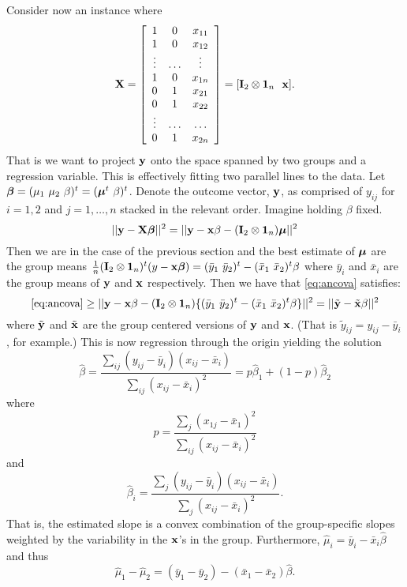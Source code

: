 Consider now an instance where
$$
\mathbf{X} =
\left[
\begin{array}{ccc}
1 & 0  & x_{11} \\
1 & 0  & x_{12} \\
\vdots &  \ldots  & \vdots \\
1  & 0 & x_{1n}  \\
0  & 1 & x_{21} \\
0  & 1 & x_{22} \\
\vdots & \ldots & \ldots \\
0  & 1 & x_{2n}
\end{array}
\right]
= [\mathbf{I}_{2} \otimes \mathbf{1}_n ~~ \mathbf{x}]
.
$$
That is we want to project $\mathbf{y}$ onto the space spanned by two groups
and a regression variable. This is effectively fitting two parallel
lines to the data.
Let $\boldsymbol{\beta} = (\mu_1 ~ \mu_2 ~ \beta)^t = (\boldsymbol{\mu}^t ~ \beta)^t$. Denote the outcome
vector, $\mathbf{y}$, as comprised of $y_{ij}$ for $i=1,2$ and $j=1,\ldots,n$
stacked in the relevant order. Imagine holding $\beta$ fixed. 
\begin{equation}
\label{eq:ancova}
|| \mathbf{y} - \mathbf{X} \boldsymbol{\beta} ||^2 = 
|| \mathbf{y} - \mathbf{x} \beta - (\mathbf{I}_2 \otimes \mathbf{1}_n) \boldsymbol{\mu} ||^2
\end{equation}
Then we
are in the case of the previous section and the best estimate
of $\boldsymbol{\mu}$ are the group means $\frac{1}{n}(\mathbf{I}_2 \otimes \mathbf{1}_n)^t(y - \mathbf{x} \boldsymbol{\beta}) = (\bar y_1 ~ \bar y_2)^t - (\bar x_1 ~ \bar x_2)^t \beta$ where
$\bar y_i$ and $\bar x_i$ are the group means of $\mathbf{y}$ and $\mathbf{x}$ respectively.
Then we have that \eqref{eq:ancova} satisfies:
$$
\eqref{eq:ancova} \geq 
|| \mathbf{y} - \mathbf{x} \beta - (\mathbf{I}_2 \otimes \mathbf{1}_n) \{(\bar y_1 ~ \bar y_2)^t - (\bar x_1 ~ \bar x_2)^t \beta\}||^2
= || \tilde {\mathbf{y}} - \tilde {\mathbf{x}} \beta||^2
$$
where $\tilde {\mathbf{y}}$ and $\tilde {\mathbf{x}}$ are the group centered versions 
of $\mathbf{y}$ and $\mathbf{x}$. (That is $\tilde y_{ij} = y_{ij} - \bar y_i$, for example.)
This is now regression through the origin yielding the solution
$$
\hat \beta 
= \frac{\sum_{ij} (y_{ij} - \bar y_i) (x_{ij} - \bar x_i)}
{\sum_{ij} (x_{ij} - \bar x_i)^2}
= p \hat \beta_1 + (1 - p) \hat \beta_2
$$
where 
$$
p = \frac{\sum_{j} (x_{1j} - \bar x_1)^2}{\sum_{ij} (x_{ij} - \bar x_i)^2}
$$
and 
$$
\hat \beta_i =
\frac{\sum_{j} (y_{ij} - \bar y_i) (x_{ij} - \bar x_i)}
{\sum_{j} (x_{ij} - \bar x_i)^2}.
$$
That is, the estimated slope is a convex combination of the
group-specific slopes weighted by the variability in the $\mathbf{x}$'s
in the group. Furthermore,
$\hat \mu_i = \bar y_i - \bar x_i \hat \beta$ and thus
$$
\hat \mu_1 - \hat \mu_2
= (\bar y_1 - \bar y_2) - (\bar x_1 - \bar x_2) \hat \beta.
$$
